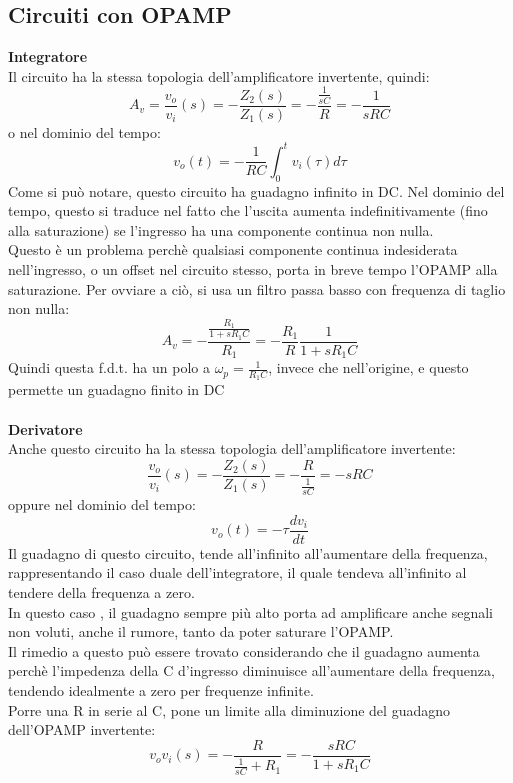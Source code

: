 \documentclass{article}
\begin{document}
\subsection{Circuiti con OPAMP}
\textbf{Integratore}\\
Il circuito ha la stessa topologia dell'amplificatore invertente, quindi:
\begin{equation}
    A_{v}=\frac{v_{o}}{v_{i}}(s)=-\frac{Z_{2}(s)}{Z_{1}(s)}=-\frac{\frac{1}{sC}}{R}=-\frac{1}{sRC}
\end{equation}
o nel dominio del tempo:
\begin{equation}
    v_{o}(t)=-\frac{1}{RC}\int_{0}^{t}v_{i}(\tau)d\tau
\end{equation}
Come si può notare, questo circuito ha guadagno infinito in DC. Nel dominio del tempo, questo si traduce nel fatto che l'uscita aumenta indefinitivamente (fino alla saturazione) se l'ingresso ha una componente continua non nulla.\\
Questo è un problema perchè qualsiasi componente continua indesiderata nell'ingresso, o un offset nel circuito stesso, porta in breve tempo l'OPAMP alla saturazione.
Per ovviare a ciò, si usa un filtro passa basso con frequenza di taglio non nulla:
\begin{equation}
A_{v}=-\frac{\frac{R_{1}}{1+sR_{1}C}}{R_{1}}=-\frac{R_{1}}{R}\frac{1}{1+sR_{1}C}
\end{equation}
Quindi questa f.d.t. ha un polo a $\omega_{p}=\frac{1}{R_{1}C}$, invece che nell'origine, e questo permette un guadagno finito in DC \\\\
\textbf{Derivatore}\\
Anche questo circuito ha la stessa topologia dell'amplificatore invertente:
\begin{equation}
    \frac{v_{o}}{v_{i}}(s)=-\frac{Z_{2}(s)}{Z_{1}(s)}=-\frac{R}{\frac{1}{sC}}=-sRC
\end{equation}
oppure nel dominio del tempo:
\begin{equation}
    v_{o}(t)=-\tau\frac{dv_{i}}{dt}
\end{equation}
Il guadagno di questo circuito, tende all'infinito all'aumentare della frequenza, rappresentando il caso duale dell'integratore, il quale tendeva all'infinito al tendere della frequenza a zero.\\
In questo caso , il guadagno sempre più alto porta ad amplificare anche segnali non voluti, anche il rumore, tanto da poter saturare l'OPAMP.\\
Il rimedio a questo può essere trovato considerando che il guadagno aumenta perchè l'impedenza della C d'ingresso diminuisce all'aumentare della frequenza, tendendo idealmente a zero per frequenze infinite.\\
Porre una R in serie al C, pone un limite alla diminuzione del guadagno dell'OPAMP invertente:
\begin{equation}
    {v_{o}}{v_{i}}(s)=-\frac{R}{\frac{1}{sC}+R_{1}}=-\frac{sRC}{1+sR_{1}C}
\end{equation}
\end{document}
